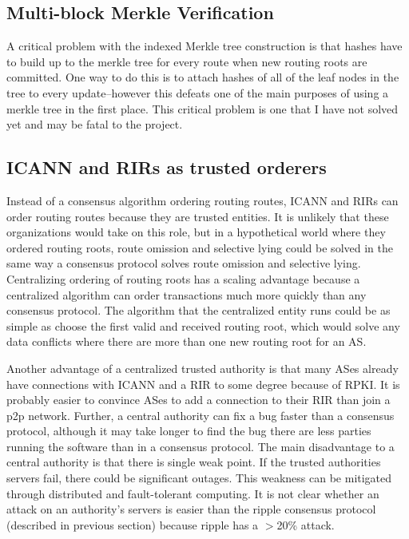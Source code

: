 \documentclass[letterpaper, 10 pt, conference]{ieeeconf}  %
\begin{document}
\subsection{Multi-block Merkle Verification}

A critical problem with the indexed Merkle tree construction is that hashes have to build up to the merkle tree for every route when new routing roots are committed. One way to do this is to attach hashes of all of the leaf nodes in the tree to every update--however this defeats one of the main purposes of using a merkle tree in the first place. This critical problem is one that I have not solved yet and may be fatal to the project.

\subsection{ICANN and RIRs as trusted orderers}

Instead of a consensus algorithm ordering routing routes, ICANN and RIRs can order routing routes because they are trusted entities. It is unlikely that these organizations would take on this role, but in a hypothetical world where they ordered routing roots, route omission and selective lying could be solved in the same way a consensus protocol solves route omission and selective lying. Centralizing ordering of routing roots has a scaling advantage because a centralized algorithm can order transactions much more quickly than any consensus protocol. The algorithm that the centralized entity runs could be as simple as choose the first valid and received routing root, which would solve any data conflicts where there are more than one new routing root for an AS. 

Another advantage of a centralized trusted authority is that many ASes already have connections with ICANN and a RIR to some degree because of RPKI. It is probably easier to convince ASes to add a connection to their RIR than join a p2p network. Further, a central authority can fix a bug faster than a consensus protocol, although it may take longer to find the bug there are less parties running the software than in a consensus protocol. The main disadvantage to a central authority is that there is single weak point. If the trusted authorities servers fail, there could be significant outages. This weakness can be mitigated through distributed and fault-tolerant computing. It is not clear whether an attack on an authority's servers is easier than the ripple consensus protocol (described in previous section) because ripple has a $>$20\% attack.
\end{document}
